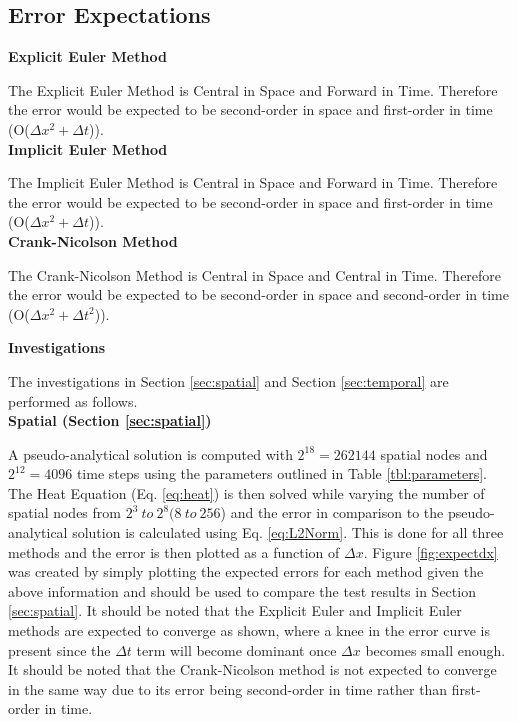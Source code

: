 \documentclass[10pt, letter, showtrims]{extarticle}
\begin{document}
		\subsection{Error Expectations}
		\label{sec:expectations}

		\noindent
		\textbf{Explicit Euler Method}
		
		\noindent
		The Explicit Euler Method is Central in Space and Forward in Time. Therefore the error would be expected to be second-order in space and first-order in time (O($\Delta x^{2} + \Delta t$)). \\
		
		\noindent
		\textbf{Implicit Euler Method}
		
		\noindent
		The Implicit Euler Method is Central in Space and Forward in Time. Therefore the error would be expected to be second-order in space and first-order in time (O($\Delta x^{2} + \Delta t$)). \\
		
		\noindent
		\textbf{Crank-Nicolson Method}
		
		\noindent
		The Crank-Nicolson Method is Central in Space and Central in Time. Therefore the error would be expected to be second-order in space and second-order in time (O($\Delta x^{2} + \Delta t^{2}$)). \\
		
		\pagebreak
		
		\noindent
		\textbf{Investigations}
		
		\noindent
		The investigations in Section \ref{sec:spatial} and Section \ref{sec:temporal} are performed as follows. \\
		
		\noindent
		\textbf{Spatial (Section \ref{sec:spatial})}
		
		\noindent
		A pseudo-analytical solution is computed with $2^{18} = 262144$ spatial nodes and $2^{12} = 4096$ time steps using the parameters outlined in Table \ref{tbl:parameters}. The Heat Equation (Eq. \ref{eq:heat}) is then solved while varying the number of spatial nodes from $2^{3}\ to\ 2^{8} (8\ to\ 256$) and the error in comparison to the pseudo-analytical solution is calculated using Eq. \ref{eq:L2Norm}. This is done for all three methods and the error is then plotted as a function of $\Delta x$. Figure \ref{fig:expectdx} was created by simply plotting the expected errors for each method given the above information and should be used to compare the test results in Section \ref{sec:spatial}. It should be noted that the Explicit Euler and Implicit Euler methods are expected to converge as shown, where a knee in the error curve is present since the $\Delta t$ term will become dominant once $\Delta x$ becomes small enough. It should be noted that the Crank-Nicolson method is not expected to converge in the same way due to its error being second-order in time rather than first-order in time. \\
		
\end{document}
